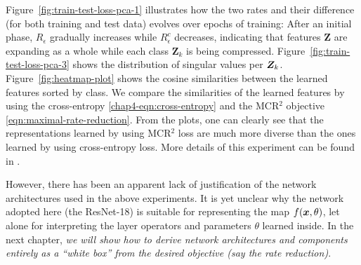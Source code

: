 \documentclass[../../book-main.tex]{subfiles}
\begin{document}
\begin{example}
	Figure~\ref{fig:train-test-loss-pca-1} illustrates how the two rates and their difference (for both training and test data) evolves over epochs of training: After an initial phase, $R_\epsilon$ gradually increases while $R^c_\epsilon$ decreases, indicating that features $\bm Z$ are expanding as a whole while each class $\bm Z_k$ is being compressed.
	Figure~\ref{fig:train-test-loss-pca-3} shows the distribution of singular values per $\bm{Z}_k$.  Figure~\ref{fig:heatmap-plot} shows the cosine similarities between the learned features sorted by class. We compare the similarities of the learned features by using the cross-entropy \eqref{chap4-eqn:cross-entropy} and the MCR$^2$ objective \eqref{eqn:maximal-rate-reduction}. From the plots, one can clearly see that the representations learned by using MCR$^2$ loss are much more diverse than the ones learned by using cross-entropy loss. More details of this experiment can be found in \cite{chan2021redunet}.
	\label{eg:Rate-Reduction-CIFAR10}
\end{example}


However, there has been an apparent lack of justification of the network architectures used in the above experiments. It is yet unclear why the network adopted here (the ResNet-18) is suitable for representing the map $f(\bm{x}, \theta)$, let alone for interpreting the layer operators and parameters $\theta$ learned inside. In the next chapter, {\em we will show how to derive network architectures and components entirely as a ``white box'' from the desired objective (say the rate reduction)}.
\end{document}

